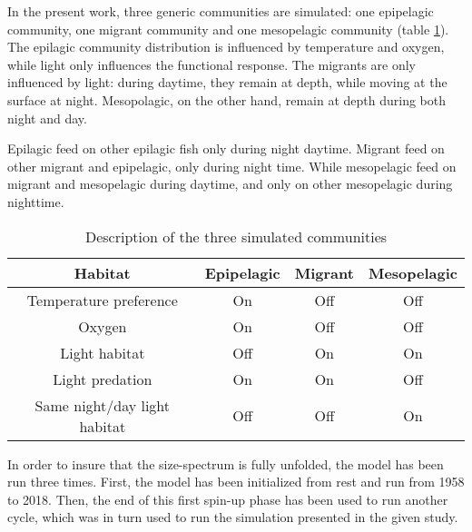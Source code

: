 In the present work, three generic communities are simulated: one epipelagic community, one migrant community and one mesopelagic community (table \ref{t:com-habitat}). 
The epilagic community distribution is influenced by temperature and oxygen, while light only influences the functional response. The 
migrants are only influenced by light: during daytime, they remain at depth, while moving at the 
surface at night. Mesopolagic, on the other hand, remain at depth during both night and day.

Epilagic feed on other epilagic fish only during night daytime. Migrant feed on other migrant and epipelagic, only during night time. While mesopelagic feed on migrant and mesopelagic during daytime, and only on other mesopelagic during nighttime.

\begin{table}
\begin{tabular}{cccc}
     Habitat & Epipelagic & Migrant & Mesopelagic \\
     \hline
     \hline
      Temperature preference & On & Off & Off\\
      Oxygen & On & Off & Off \\
      Light habitat & Off & On & On \\
      Light predation & On & On & Off \\
      Same night/day light habitat  & Off & Off & On \\
\end{tabular}
\caption{Description of the three simulated communities}
\label{t:com-habitat}
\end{table}

In order to insure that the size-spectrum is fully unfolded, the model has been run three times. First, the model has been initialized from rest and run from 1958 to 2018. Then, the end of this first spin-up phase has been used to run another cycle, which was in turn used to run the simulation presented in the given study.















